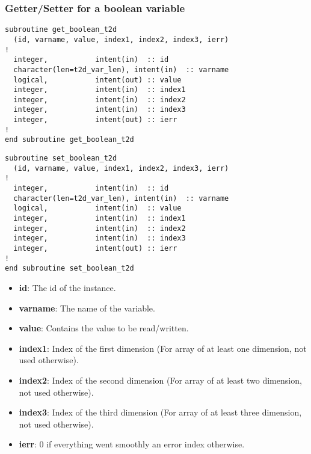 \subsubsection{Getter/Setter for a boolean variable}
%
\begin{lstlisting}
subroutine get_boolean_t2d
  (id, varname, value, index1, index2, index3, ierr)
!
  integer,           intent(in)  :: id
  character(len=t2d_var_len), intent(in)  :: varname
  logical,           intent(out) :: value
  integer,           intent(in)  :: index1
  integer,           intent(in)  :: index2
  integer,           intent(in)  :: index3
  integer,           intent(out) :: ierr
!        
end subroutine get_boolean_t2d
\end{lstlisting}
\begin{lstlisting}
subroutine set_boolean_t2d
  (id, varname, value, index1, index2, index3, ierr)
!
  integer,           intent(in)  :: id
  character(len=t2d_var_len), intent(in)  :: varname
  logical,           intent(in)  :: value
  integer,           intent(in)  :: index1
  integer,           intent(in)  :: index2
  integer,           intent(in)  :: index3
  integer,           intent(out) :: ierr
!        
end subroutine set_boolean_t2d
\end{lstlisting}

\begin{itemize}
\item \textbf{id}: The id of the instance.
\item \textbf{varname}: The name of the variable.
\item \textbf{value}: Contains the value to be read/written.
\item \textbf{index1}: Index of the first dimension (For array of at least one
dimension, not used otherwise).
\item \textbf{index2}: Index of the second dimension (For array of at least two
dimension, not used otherwise).
\item \textbf{index3}: Index of the third dimension (For array of at least
three dimension, not used otherwise).
\item \textbf{ierr}: 0 if everything went smoothly an error index otherwise.
\end{itemize}

